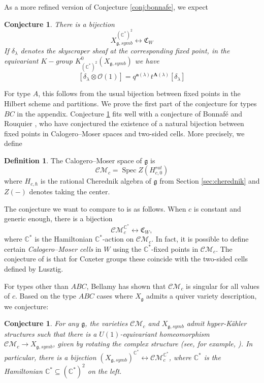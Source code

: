 \documentclass{amsart}
\numberwithin{equation}{section}
\newtheorem{conjecture}[lemma]{Conjecture}%
\theoremstyle{definition}
\newtheorem{definition}[lemma]{Definition}%
\DeclareMathOperator{\Spec}{Spec}
\newcommand{\cO}{\mathcal{O}}
\newcommand{\fg}{\mathfrak{g}}
\newcommand{\C}{{\mathbb C}}
\newcommand{\CM}{\mathcal{CM}}
\begin{document}
As a more refined version of Conjecture \ref{conj:bonnafe}, we expect
\begin{conjecture}
\label{conj:fixedpoints}
There is a bijection
$$X_{\fg,symb}^{(\C^*)^2}\leftrightarrow \mathfrak{C}_W$$
If $\delta_\lambda$ denotes the skyscraper sheaf at the corresponding fixed point, in the equivariant $K-$group $K^0_{(\C^*)^2}(X_{\fg,symb})$ we have 
$$[\delta_\lambda\otimes \cO(1)]=q^{\mathbf{a}(\lambda)}t^{\mathbf{A}(\lambda)}[\delta_\lambda]$$
\end{conjecture}
 For type $A$, this follows from the usual bijection between fixed points in the Hilbert scheme and partitions. We prove the first part of the conjecture for types $BC$ in the appendix.
Conjecture \ref{conj:fixedpoints} fits well with a conjecture of Bonnaf\'e and Rouquier \cite{BonnafeRouquier}, who have conjectured the existence of a natural bijection between fixed points in Calogero--Moser spaces and two-sided cells. More precisely, we define
\begin{definition}
\label{def:CM}
The Calogero--Moser space of $\fg$ is 
$$\CM_{c}=\Spec Z(H^{rat}_{c,0})$$ where $H_{c,\hbar}$ is the rational Cherednik algebra of $\fg$ from Section \ref{sec:cherednik} and $Z(-)$ denotes taking the center.
\end{definition}
The conjecture we want to compare to is as follows. When $c$ is constant and generic enough, there is a bijection
$$\CM_c^{\C^*}\leftrightarrow \mathfrak{C}_W,$$ where $\C^*$ is the Hamiltonian $\C^*$-action on $\CM_c$.
In fact, it is possible to define certain {\em Calogero--Moser cells} in $W$ using the $\C^*$-fixed points in $\CM_c$. The conjecture of \cite{BonnafeRouquier} is that for Coxeter groups these coincide with the two-sided cells defined by Lusztig.


For types other than $ABC$, Bellamy has shown \cite{Bellamy} that $\CM_c$ is singular for all values of $c$.
Based on the type $ABC$ cases where $X_\fg$ admits a quiver variety description, we conjecture:
\begin{conjecture}
\label{conj:hyperkaehler}
    For any $\fg$, the varieties $\CM_c$ and $X_{\fg, symb}$ admit hyper-Kähler structures such that there is a $U(1)$-equivariant homeomorphism $\CM_c\to X_{\fg,symb}$, given by rotating the complex structure (see, for example, \cite[3.7.]{GordonO}). In particular, there is a bijection $(X_{\fg,symb})^{\C^*}\leftrightarrow \CM_c^{\C^*}$, where $\C^*$ is the Hamiltonian $\C^*\subseteq (\C^*)^2$ on the left.
\end{conjecture}
\end{document}
